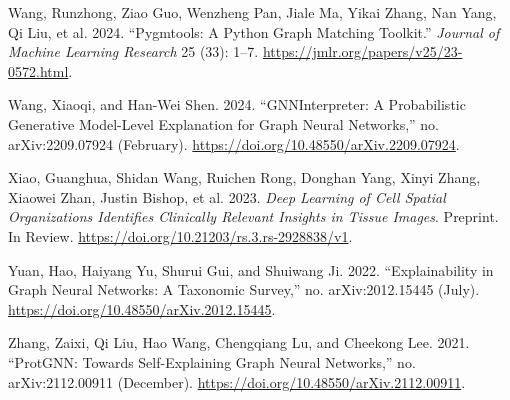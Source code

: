 \documentclass[
  11pt,
  letterpaper,
]{article}
\newlength{\cslhangindent}
\newlength{\cslentryspacingunit} %
\newenvironment{CSLReferences}[2] %
 {%
  \setlength{\parindent}{0pt}
  \ifodd #1
  \let\oldpar\par
  \def\par{\hangindent=\cslhangindent\oldpar}
  \fi
  \setlength{\parskip}{#2\cslentryspacingunit}
 }%
 {}
\begin{document}
\begin{CSLReferences}{1}{0}
\leavevmode{}%
Wang, Runzhong, Ziao Guo, Wenzheng Pan, Jiale Ma, Yikai Zhang, Nan Yang,
Qi Liu, et al. 2024. {``Pygmtools: A Python Graph Matching Toolkit.''}
\emph{Journal of Machine Learning Research} 25 (33): 1--7.
\url{https://jmlr.org/papers/v25/23-0572.html}.

\leavevmode{}%
Wang, Xiaoqi, and Han-Wei Shen. 2024. {``GNNInterpreter: A Probabilistic
Generative Model-Level Explanation for Graph Neural Networks,''} no.
arXiv:2209.07924 (February).
\url{https://doi.org/10.48550/arXiv.2209.07924}.

\leavevmode{}%
Xiao, Guanghua, Shidan Wang, Ruichen Rong, Donghan Yang, Xinyi Zhang,
Xiaowei Zhan, Justin Bishop, et al. 2023. \emph{Deep Learning of Cell
Spatial Organizations Identifies Clinically Relevant Insights in Tissue
Images}. Preprint. In Review.
\url{https://doi.org/10.21203/rs.3.rs-2928838/v1}.

\leavevmode{}%
Yuan, Hao, Haiyang Yu, Shurui Gui, and Shuiwang Ji. 2022.
{``Explainability in Graph Neural Networks: A Taxonomic Survey,''} no.
arXiv:2012.15445 (July).
\url{https://doi.org/10.48550/arXiv.2012.15445}.

\leavevmode{}%
Zhang, Zaixi, Qi Liu, Hao Wang, Chengqiang Lu, and Cheekong Lee. 2021.
{``ProtGNN: Towards Self-Explaining Graph Neural Networks,''} no.
arXiv:2112.00911 (December).
\url{https://doi.org/10.48550/arXiv.2112.00911}.

\end{CSLReferences}
\end{document}
